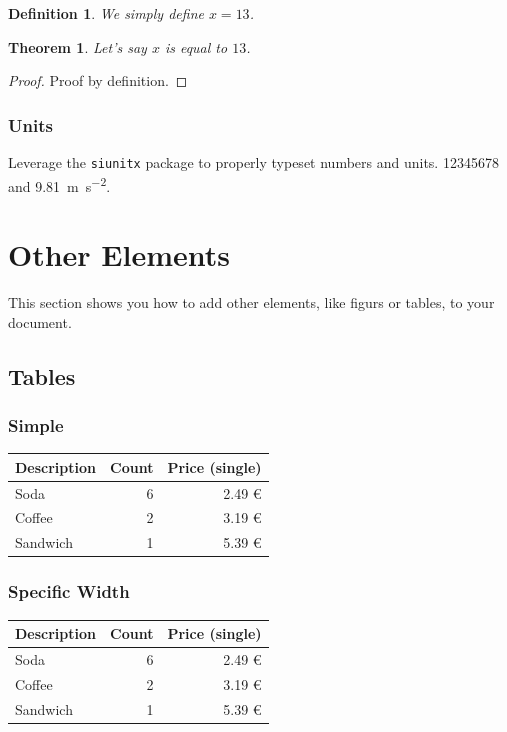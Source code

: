 \documentclass[parskip=half]{scrbook}
\newtheorem{definition}{Definition}[section]
\newtheorem{theorem}{Theorem}
\begin{document}
\begin{definition}
	We simply define $x = 13$.
\end{definition}

\begin{theorem}
	Let's say $x$ is equal to $13$.
\end{theorem}

\begin{proof}
	Proof by definition.
\end{proof}

\subsection{Units}

Leverage the \texttt{siunitx} package to properly typeset numbers and units.
\num{12345678} and \SI{9.81}{\meter\per\second^2}.

\chapter{Other Elements}

This section shows you how to add other elements, like figurs or tables, to your document.

\section{Tables}

\subsection{Simple}

\begin{center}
\begin{tabular}{lrr}
	\toprule
	Description & Count & Price (single)\\
	\midrule
	Soda & 6 & 2.49 €\\
	Coffee & 2 & 3.19 €\\
	Sandwich & 1 & 5.39 €\\
	\bottomrule
\end{tabular}
\end{center}

\subsection{Specific Width}

\begin{center}
\begin{tabularx}{0.75\textwidth}{Xrr}
	\toprule
	Description & Count & Price (single)\\
	\midrule
	Soda & 6 & 2.49 €\\
	Coffee & 2 & 3.19 €\\
	Sandwich & 1 & 5.39 €\\
	\bottomrule
\end{tabularx}
\end{center}
\end{document}
